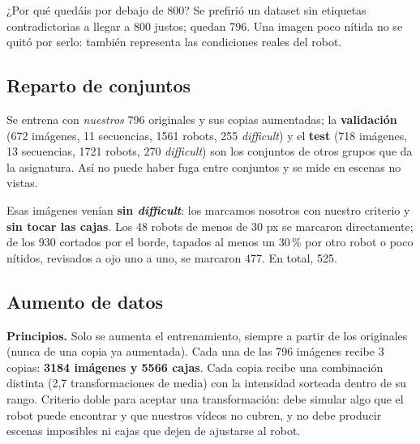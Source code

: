 \documentclass[11pt,a4paper]{article}
\begin{document}
\begin{pregunta}{¿Por qué quedáis por debajo de 800?}
Se prefirió un dataset sin etiquetas contradictorias a llegar a 800 justos; quedan 796. Una imagen poco nítida no se quitó por serlo: también representa las condiciones reales del robot.
\end{pregunta}

\subsection{Reparto de conjuntos}
Se entrena con \emph{nuestros} 796 originales y sus copias aumentadas; la \textbf{validación} (672 imágenes, 11 secuencias, 1561 robots, 255 \emph{difficult}) y el \textbf{test} (718 imágenes, 13 secuencias, 1721 robots, 270 \emph{difficult}) son los conjuntos de otros grupos que da la asignatura. Así no puede haber fuga entre conjuntos y se mide en escenas no vistas.

Esas imágenes venían \textbf{sin \emph{difficult}}: los marcamos nosotros con nuestro criterio y \textbf{sin tocar las cajas}. Los 48 robots de menos de 30 px se marcaron directamente; de los 930 cortados por el borde, tapados al menos un 30\,\% por otro robot o poco nítidos, revisados a ojo uno a uno, se marcaron 477. En total, 525.

\subsection{Aumento de datos}\label{sec:aumento}
\textbf{Principios.} Solo se aumenta el entrenamiento, siempre a partir de los originales (nunca de una copia ya aumentada). Cada una de las 796 imágenes recibe 3 copias: \textbf{3184 imágenes y 5566 cajas}. Cada copia recibe una combinación distinta (2,7 transformaciones de media) con la intensidad sorteada dentro de su rango. Criterio doble para aceptar una transformación: debe simular algo que el robot puede encontrar y que nuestros vídeos no cubren, y no debe producir escenas imposibles ni cajas que dejen de ajustarse al robot.
\end{document}
